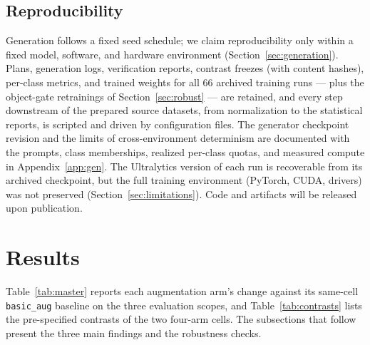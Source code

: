 \documentclass[preprint,12pt,authoryear]{elsarticle}
\begin{document}
\subsection{Reproducibility}\label{sec:repro}
Generation follows a fixed seed schedule; we claim reproducibility
only within a fixed model, software, and hardware environment
(Section~\ref{sec:generation}). Plans, generation logs, verification
reports, contrast freezes (with content hashes), per-class metrics, and
trained weights for all 66 archived training runs --- plus the
object-gate retrainings of Section~\ref{sec:robust} --- are retained,
and every step downstream of the prepared source datasets, from
normalization to the statistical reports, is scripted and driven by
configuration files.
The generator checkpoint revision and the limits of cross-environment
determinism are documented with the prompts, class memberships,
realized per-class quotas, and measured compute in
Appendix~\ref{app:gen}. The Ultralytics version of each run is recoverable from its archived
checkpoint, but the full training environment (PyTorch, CUDA, drivers)
was not preserved (Section~\ref{sec:limitations}). Code and artifacts
will be released upon publication.

\section{Results}\label{sec:results}

Table~\ref{tab:master} reports each augmentation arm's change
against its
same-cell \texttt{basic\_aug} baseline on the three evaluation scopes,
and Table~\ref{tab:contrasts} lists the pre-specified contrasts of the
two four-arm cells. The subsections that follow present the three main
findings and the robustness checks.
\end{document}
